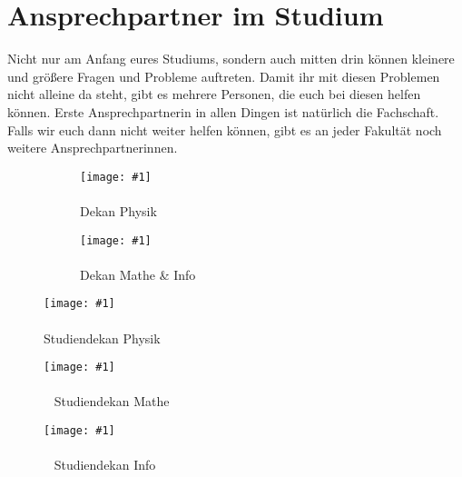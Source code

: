 \section*{Ansprechpartner im Studium}

Nicht nur am Anfang eures Studiums, sondern auch mitten drin können kleinere und größere Fragen und Probleme auftreten. Damit ihr mit diesen Problemen nicht alleine da steht, gibt es mehrere Personen, die euch bei diesen helfen können. Erste Ansprechpartnerin in allen Dingen ist natürlich die Fachschaft. Falls wir euch dann nicht weiter helfen können, gibt es an jeder Fakultät noch weitere Ansprechpartnerinnen.

\newcommand{\proffoto}[2]{
    \centering
    \texttt{[image: \#1]}\\
    #2
    \vspace{4mm}
}

\begin{figure}[b]
    \vspace*{4mm}
    \begin{subfigure}{.5\linewidth}
        \ifdefined\dekanphysikfoto
            \proffoto{\dekanphysikfoto}{\dekanphysiklang\\[-1ex]{\scriptsize Dekan Physik}}
        \fi
    \end{subfigure}
    \begin{subfigure}{.42\linewidth}

        \ifdefined\dekanmathefoto
            \proffoto{\dekanmathefoto}{\dekanmathelang\\[-1ex]{\scriptsize Dekan Mathe \& Info}}
        \fi
    \end{subfigure}
\end{figure}

\begin{figure*}
    \centering
    \begin{subfigure}{.3\linewidth}
        \ifdefined\studiendekanphysikfoto
            \proffoto{\studiendekanphysikfoto}{\studiendekanphysik\\[-1ex]{\scriptsize Studiendekan Physik}}
        \fi
    \end{subfigure}
    \begin{subfigure}{.22\linewidth}
        \ifdefined\studiendekanmathefoto
            \proffoto{\studiendekanmathefoto}{\studiendekanmathe\\[-1ex]{\scriptsize ~ Studiendekan Mathe}}
        \fi
    \end{subfigure}
    \begin{subfigure}{.3\linewidth}
        \ifdefined\studiendekaninformatikfoto
            \proffoto{\studiendekaninformatikfoto}{\studiendekaninformatik\\[-1ex]{\scriptsize ~ Studiendekan Info}}
        \fi
    \end{subfigure}
\end{figure*}


